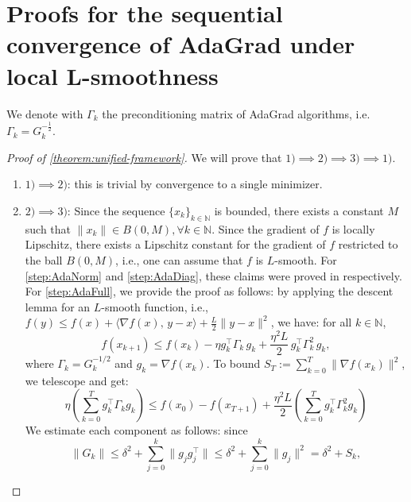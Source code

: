 \documentclass{article}
\theoremstyle{plain}
\theoremstyle{definition}
\theoremstyle{remark}
\newcommand{\ip}[2]{\langle #1,\, #2 \rangle}
\newcommand*{\NN}{\mathbb{N}}
\begin{document}


\section{Proofs for the sequential convergence of AdaGrad under local L-smoothness}

We denote with $\Gamma_k$ the preconditioning matrix of AdaGrad algorithms, i.e.~$\Gamma_k = G_k^{-\frac12}$.

\begin{proof}[Proof of \cref{theorem:unified-framework}]
We will prove that $1) \implies 2) \implies 3) \implies 1)$.
\begin{enumerate}[leftmargin=*]
    \item $1) \implies 2)$: this is trivial by convergence to a single minimizer.
    \item $2) \implies 3)$: Since the sequence $\{x_k\}_{k\in\NN}$ is bounded, there exists a constant $M$ such that $\|x_k\| \in B(0,M), \forall k \in \NN$. Since the gradient of $f$ is locally Lipschitz, there exists a Lipschitz constant for the gradient of $f$ restricted to the ball $B(0,M)$, i.e., one can assume that $f$ is $L$-smooth.
    For \ref{step:AdaNorm} and \ref{step:AdaDiag}, these claims were proved in \citet[Lemma 3 and 4]{traore2021sequential} respectively. For \ref{step:AdaFull}, we provide the proof as follows: by applying the descent lemma for an $L$-smooth function, i.e., $f(y) \leq f(x) + \ip{\nabla f(x)}{y - x} + \frac{L}{2}\|y - x\|^2$, we have: for all $k \in \NN$,
    \begin{equation*}
        f(x_{k+1}) \leq f(x_k) - \eta g_k^\top \Gamma_k\,g_k
       + \frac{\eta^2 L}{2}\,g_k^\top \Gamma_k^2\,g_k,
    \end{equation*}
    where $\Gamma_k = G_k^{-1/2}$ and $g_k = \nabla f(x_k)$. To bound $S_T := \sum_{k = 0}^T \|\nabla f(x_k)\|^2$, we telescope and get:
    \begin{equation}
        \label{eq:telescope-L-smooth}
        \eta\left(\sum_{k = 0}^T g_k^\top\Gamma_kg_k\right) \leq f(x_0) - f(x_{T+1}) + \frac{\eta^2  L}{2} \left(\sum_{k = 0}^T g_k^\top \Gamma_k^2 g_k\right)
    \end{equation}
    We estimate each component as follows: since 
    \begin{equation}
        \label{eq:upper-bound-G-k}
        \|G_k\| \leq \delta^2 + \sum_{j = 0}^k \|g_jg_j^\top\| \leq \delta^2 + \sum_{j = 0}^k \|g_j\|^2 = \delta^2 + S_k,

\end{equation}
\end{enumerate}
\end{proof}
\end{document}
